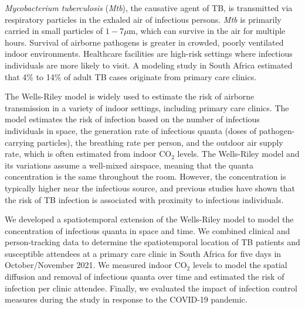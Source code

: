 \documentclass[fleqn,11pt]{wlscirep}
\begin{document}
\emph{Mycobacterium tuberculosis} (\emph{Mtb}), the causative agent of TB, is transmitted via respiratory particles in the exhaled air of infectious persons\cite{Rieder1999,Patterson2021Tuberculosis}. \emph{Mtb} is primarily carried in small particles of $1-7\mu$m\cite{Fennelly2020Lancet}, which can survive in the air for multiple hours\cite{Loudon1969AMRRD}. Survival of airborne pathogens is greater in crowded, poorly ventilated indoor environments\cite{Rieder1999,CPS2013Book,Nardell1991ARRD,Wang2021Science,Morawska2021}. Healthcare facilities are high-risk settings where infectious individuals are more likely to visit\cite{McCreesh2020IJTLD}. A modeling study in South Africa estimated that 4\% to 14\% of adult TB cases originate from primary care clinics\cite{McCreesh2022BMJGlobalHealth}.

The Wells-Riley model\cite{Riley1961Book} is widely used to estimate the risk of airborne transmission in a variety of indoor settings\cite{Haddrell2024NatCommun,Andrews2014JID,Taylor2016IJTLD,Hella2017JInfect,Zemouri2020JDR}, including primary care clinics\cite{Zurcher2022JID,McCreesh2021BMJGlobalHealth}. The model estimates the risk of infection based on the number of infectious individuals in space, the generation rate of infectious quanta (doses of pathogen-carrying particles), the breathing rate per person, and the outdoor air supply rate, which is often estimated from indoor CO$_2$ levels\cite{Rudnick2003IndoorAir,Richardson2014PONE,Haddrell2024NatCommun}. The Wells-Riley model and its variations\cite{Rudnick2003IndoorAir} assume a well-mixed airspace, meaning that the quanta concentration is the same throughout the room. However, the concentration is typically higher near the infectious source\cite{Wang2021Science,Vuorinen2020SafSci,Chen2020BuildEnv}, and previous studies have shown that the risk of TB infection is associated with proximity to infectious individuals\cite{Ko2004RiskAnal,Kenyon1996NEJM}.

We developed a spatiotemporal extension of the Wells-Riley model to model the concentration of infectious quanta in space and time. We combined clinical and person-tracking data to determine the spatiotemporal location of TB patients and susceptible attendees at a primary care clinic in South Africa for five days in October/November 2021. We measured indoor CO$_2$ levels to model the spatial diffusion and removal of infectious quanta over time and estimated the risk of infection per clinic attendee. Finally, we evaluated the impact of infection control measures during the study in response to the COVID-19 pandemic.
\end{document}
